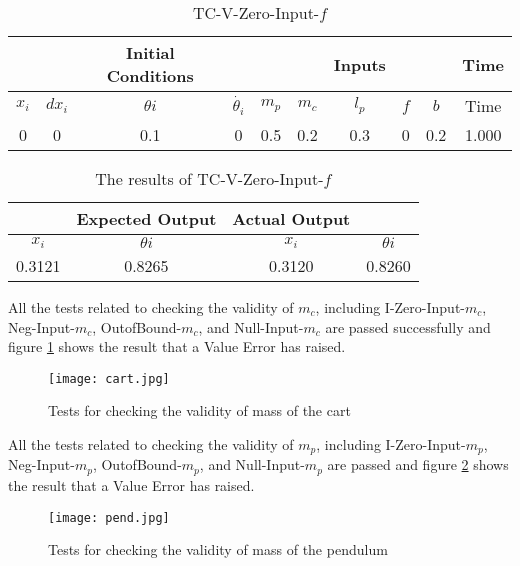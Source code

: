 \documentclass[12pt, titlepage]{article}
\begin{document}
\begin{table}[h!]
\caption{TC-V-Zero-Input-$f$} \label{tbl_tc3}
\vspace*{2mm}
\centering
 \begin{tabular}{|c c c c|c c c c c|c|} 
 \hline
&&\textbf{Initial Conditions}& &  &  &  \textbf{Inputs} &  &&\textbf{Time}  \\ \hline
$x_i$&$dx_i$&$\theta{i}$&$\dot{\theta_{i}}$ & $m_p$ & $m_c$ & $l_p$ & $f$ & $b$  & Time \\ \hline
0 & 0 & 0.1 & 0 & 0.5 & 0.2 & 0.3 & 0 & 0.2 & 1.000\\
 \hline
\end{tabular}
\end{table}	

\begin{table}[h!]
\caption{The results of TC-V-Zero-Input-$f$} \label{tbl_res3}
\vspace*{2mm}
\centering
 \begin{tabular}{|c c|c c|} 
 \hline
&\textbf{Expected Output}& \textbf{Actual Output} &  \\ \hline
$x_i$&$\theta{i}$ & $x_i$&$\theta{i}$  \\ \hline
0.3121 & 0.8265 & 0.3120 & 0.8260\\
 \hline
\end{tabular}
\end{table}	

All the tests related to checking the validity of $m_c$, including I-Zero-Input-$m_c$, Neg-Input-$m_c$, OutofBound-$m_c$, and Null-Input-$m_c$ are passed successfully and figure \ref{cart} shows the result that a Value Error has raised.

 \begin{figure}[H]
\begin{center}
\texttt{[image: cart.jpg]}
 \caption{Tests for checking the validity of mass of the cart}
 \label{cart}
 \end{center}
 \end{figure}
All the tests related to checking the validity of $m_p$, including I-Zero-Input-$m_p$, Neg-Input-$m_p$, OutofBound-$m_p$, and Null-Input-$m_p$ are passed and figure \ref{pend} shows the result that a Value Error has raised.


  \begin{figure}[H]
\begin{center}
\texttt{[image: pend.jpg]}
 \caption{Tests for checking the validity of mass of the pendulum}
 \label{pend}
 \end{center}
 \end{figure}
 
\end{document}
